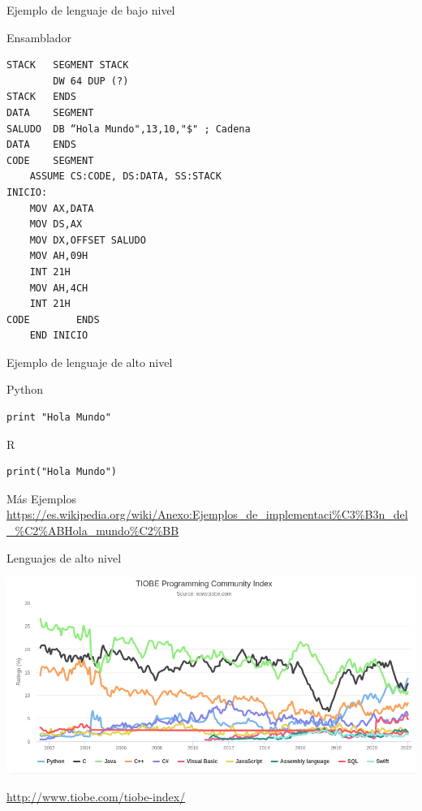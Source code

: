 \documentclass[xcolor={usenames,svgnames,dvipsnames}, aspectratio=169]{beamer}
\begin{document}
\begin{frame}[label={sec:org4868bd4},fragile]{Ejemplo de lenguaje de bajo nivel}
 \begin{block}{Ensamblador}
\begin{verbatim}
STACK	SEGMENT STACK
      	DW 64 DUP (?)
STACK 	ENDS
DATA	SEGMENT
SALUDO 	DB “Hola Mundo",13,10,"$" ; Cadena
DATA   	ENDS
CODE	SEGMENT
	ASSUME CS:CODE, DS:DATA, SS:STACK
INICIO:
	MOV AX,DATA
	MOV DS,AX
	MOV DX,OFFSET SALUDO
	MOV AH,09H
	INT 21H
	MOV AH,4CH
	INT 21H
CODE	    ENDS
	END INICIO
\end{verbatim}
\end{block}
\end{frame}

\begin{frame}[label={sec:org58ece60},fragile]{Ejemplo de lenguaje de alto nivel}
 \begin{block}{Python}
\lstset{language=Python,label= ,caption= ,captionpos=b,numbers=none}
\begin{lstlisting}
print "Hola Mundo"
\end{lstlisting}
\end{block}

\begin{block}{R}
\lstset{language=r,label= ,caption= ,captionpos=b,numbers=none}
\begin{lstlisting}
print("Hola Mundo")
\end{lstlisting}
\end{block}

\begin{block}{Más Ejemplos}
\url{https://es.wikipedia.org/wiki/Anexo:Ejemplos\_de\_implementaci\%C3\%B3n\_del\_\%C2\%ABHola\_mundo\%C2\%BB}
\end{block}
\end{frame}

\begin{frame}[label={sec:org0e901e8}]{Lenguajes de alto nivel}
\begin{center}
\includegraphics[width=.9\linewidth]{figs/TIOBEindex.png}
\end{center}

\url{http://www.tiobe.com/tiobe-index/}
\end{frame}
\end{document}
